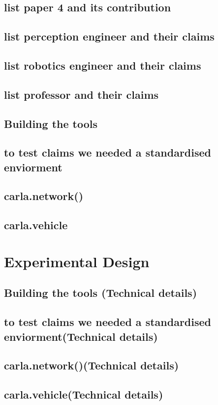 \documentclass[conference]{IEEEtran}
\begin{document}
\subsection{list paper 4 and its contribution}
\subsection{list perception engineer and their claims}
\subsection{list robotics engineer and their claims}
\subsection{list professor and their claims}
\subsection{Building the tools}
\subsection{to test claims we needed a standardised enviorment}
\subsection{carla.network()}
\subsection{carla.vehicle}




\section{Experimental Design}
\subsection{Building the tools (Technical details)}
\subsection{to test claims we needed a standardised enviorment(Technical details)}
\subsection{carla.network()(Technical details)}
\subsection{carla.vehicle(Technical details)}
\end{document}

